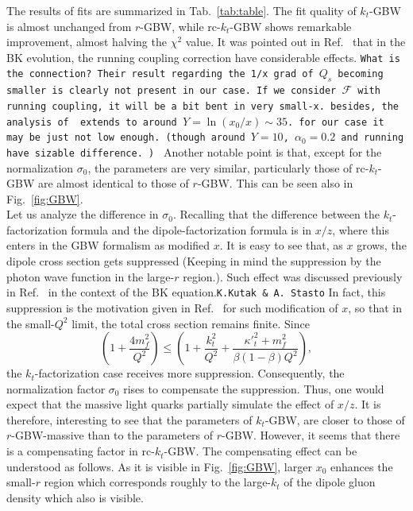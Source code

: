 \documentclass[11pt]{article}
\numberwithin{equation}{section}
\numberwithin{table}{section}
\numberwithin{figure}{section}
\newcommand{\comment}[1]{\texttt{\color{red}#1}}
\begin{document}
The results of fits are summarized in Tab.~\ref{tab:table}. 
The fit quality of $k_t$-GBW is almost unchanged from $r$-GBW, while rc-$k_t$-GBW shows remarkable improvement, almost halving the $\chi^2$ value.
It was pointed out in Ref.~\cite{Albacete:2004gw,Albacete:2007yr,Albacete:2010sy} that in the BK evolution, the running coupling correction have considerable effects. \comment{What is the connection? Their result regarding the 1/x grad of $Q_s$ becoming smaller is clearly not present in our case. If we consider $\mathcal{F}$ with running coupling, it will be a bit bent in very small-x. besides, the analysis of \cite{Albacete:2004gw} extends to around $Y=\ln(x_0/x)\sim35$. for our case it may be just not low enough. (though around $Y=10$, $\alpha_0=0.2$ and running have sizable difference. ) }
Another notable point is that, except for the normalization $\sigma_0$, the parameters are very similar, particularly those of rc-$k_t$-GBW are almost identical to those of $r$-GBW. This can be seen also in Fig.~\ref{fig:GBW}. \\
Let us analyze the difference in $\sigma_0$. 
Recalling that the difference between the $k_t$-factorization formula and the dipole-factorization formula is in $x/z$, where this enters in the GBW formalism as modified $x$. It is easy to see that, as $x$ grows, the dipole cross section gets suppressed (Keeping in mind the suppression by the photon wave function in the large-$r$ region.). Such effect was discussed previously in Ref.~\cite{Kutak:2004ym} in the context of the BK equation.\comment{K.Kutak \& A. Stasto} In fact, this suppression is the motivation given in Ref.~\cite{Golec-Biernat:1998zce} for such modification of $x$, so that in the small-$Q^2$ limit, the total cross section remains finite.    
Since 
\begin{equation}
\left(1+\frac{4 m_f^2}{Q^2}\right)\leq\left(1+\frac{k_t^2}{Q^2}+\frac{{\kappa'}_t^2+m_f^2}{\beta(1-\beta)Q^2}\right),
\end{equation}
the $k_t$-factorization case receives more suppression. Consequently, the normalization factor $\sigma_0$ rises to compensate the suppression. Thus, one would expect that the massive light quarks partially simulate the effect of $x/z$.
It is therefore, interesting to see that the parameters of $k_t$-GBW, are closer to those of $r$-GBW-massive than to the parameters of $r$-GBW.    
However, it seems that there is a compensating factor in rc-$k_t$-GBW. The compensating effect can be understood as follows. As it is visible in  Fig.~\ref{fig:GBW}, larger $x_0$ enhances the small-$r$ region which corresponds roughly to the large-$k_t$ of the dipole gluon density which also is visible. 
\end{document}
